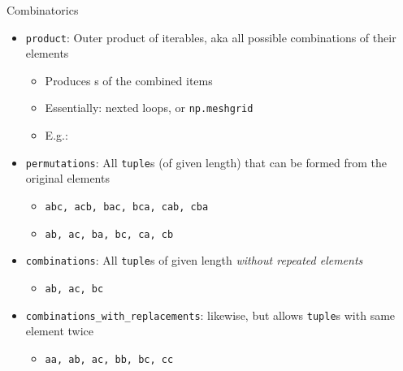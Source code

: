 \begin{frame}[fragile]{Combinatorics}
%
\begin{itemize}
\item \texttt{product}: Outer product of iterables, aka all possible combinations of their elements
	\begin{itemize}
	\item Produces s of the combined items
	\item Essentially: nexted loops, or \texttt{np.meshgrid}
	\item E.\;g.:  \thus {}
	\end{itemize}
\item \texttt{permutations}: All \texttt{tuple}s (of given length) that can be formed from the original elements
	\begin{itemize}
	\item {} \thus \texttt{abc, acb, bac, bca, cab, cba}
	\item {} \thus \texttt{ab, ac, ba, bc, ca, cb}
	\end{itemize}
\item \texttt{combinations}: All \texttt{tuple}s of given length \emph{without repeated elements}
	\begin{itemize}
	\item {} \thus \texttt{ab, ac, bc}
	\end{itemize}
\item \texttt{combinations\_with\_replacements}: likewise, but allows \texttt{tuple}s with same element twice
	\begin{itemize}
	\item {} \thus \texttt{aa, ab, ac, bb, bc, cc}
	\end{itemize}
\end{itemize}
%
\end{frame}




